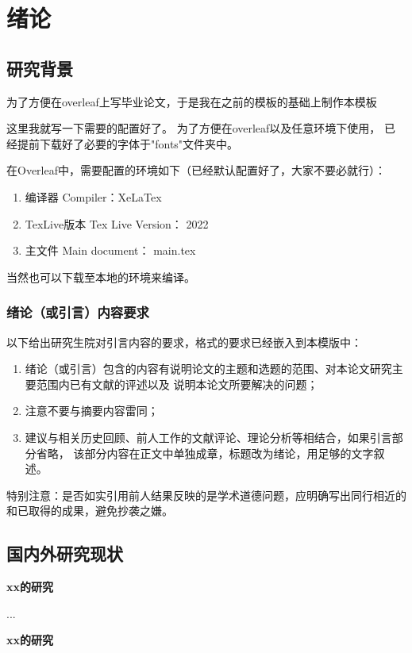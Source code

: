 
\chapter{绪论}
\label{chap01}
\section{研究背景}
为了方便在overleaf上写毕业论文，于是我在之前的模板的基础上制作本模板

这里我就写一下需要的配置好了。
为了方便在overleaf以及任意环境下使用，
已经提前下载好了必要的字体于"fonts"文件夹中。

在Overleaf中，需要配置的环境如下（已经默认配置好了，大家不要必就行）：
\begin{enumerate}
\item 编译器 Compiler：XeLaTex
\item TexLive版本 Tex Live Version： 2022
\item 主文件 Main document： main.tex
\end{enumerate}

当然也可以下载至本地的环境来编译。


\subsection{绪论（或引言）内容要求}
以下给出研究生院对引言内容的要求，格式的要求已经嵌入到本模版中：
\begin{enumerate}
\item 绪论（或引言）包含的内容有说明论文的主题和选题的范围、对本论文研究主要范围内已有文献的评述以及
  说明本论文所要解决的问题；
\item 注意不要与摘要内容雷同；
\item 建议与相关历史回顾、前人工作的文献评论、理论分析等相结合，如果引言部分省略，
  该部分内容在正文中单独成章，标题改为绪论，用足够的文字叙述。
\end{enumerate}

\zhangsan
{特别注意：是否如实引用前人结果反映的是学术道德问题，应明确写出同行相近的和已取得的成果，避免抄袭之嫌。} 

\section{国内外研究现状}
\textbf{xx的研究}

...

\textbf{xx的研究}

